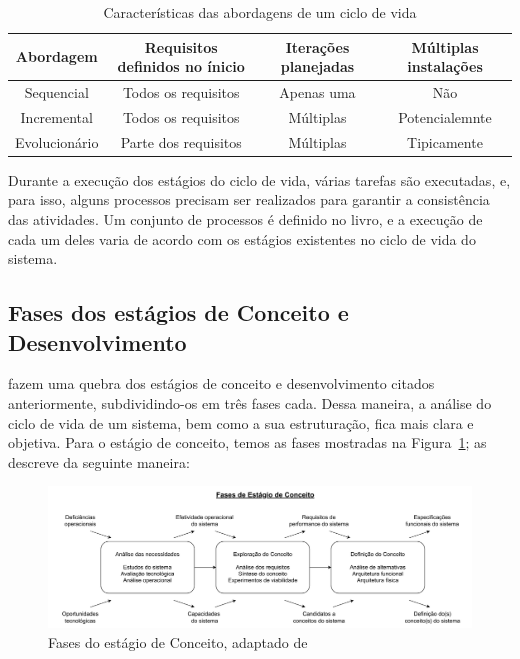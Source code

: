 	\begin{table}[!h]
		\centering
		\caption{Características das abordagens de um ciclo de vida}
		\begin{tabular}{cccc}
			\hline
			Abordagem & Requisitos definidos no ínicio & Iterações planejadas & Múltiplas instalações \\
			\hline
			Sequencial & Todos os requisitos & Apenas uma & Não\\
			Incremental & Todos os requisitos & Múltiplas & Potencialemnte\\
			Evolucionário & Parte dos requisitos & Múltiplas & Tipicamente\\
			\hline
		\end{tabular}
		\label{tab:revisao:ciclodevida:abordagens}
	\end{table}

	Durante a execução dos estágios do ciclo de vida, várias tarefas são executadas, e, para isso, alguns processos precisam ser realizados para garantir a consistência das atividades. Um conjunto de processos é definido no livro, e a execução de cada um deles varia de acordo com os estágios existentes no ciclo de vida do sistema.

	\subsection{Fases dos estágios de Conceito e Desenvolvimento}\label{sec:revisao:ciclodevida:fases}

	\cite{kossiakoff2020systems} fazem uma quebra dos estágios de conceito e desenvolvimento citados anteriormente, subdividindo-os em três fases cada. Dessa maneira, a análise do ciclo de vida
	de um sistema, bem como a sua estruturação, fica mais clara e objetiva.
	Para o estágio de conceito, temos as fases mostradas na Figura~\ref{fig:revisao:conceptStagePhases}; \cite{kossiakoff2020systems} as descreve da seguinte maneira:

	\begin{figure}[h]
		\centering
		\includegraphics[width=\textwidth]{./figuras/conceptPhases.pdf}
		\caption{Fases do estágio de Conceito, adaptado de \citep{kossiakoff2020systems}}
		\label{fig:revisao:conceptStagePhases}
	\end{figure}

